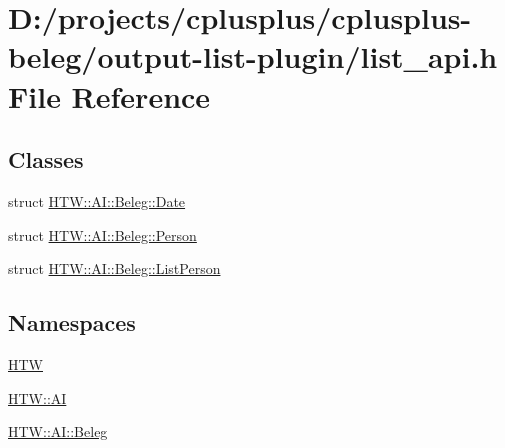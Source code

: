 \hypertarget{output-list-plugin_2list__api_8h}{\section{D\-:/projects/cplusplus/cplusplus-\/beleg/output-\/list-\/plugin/list\-\_\-api.h File Reference}
\label{output-list-plugin_2list__api_8h}
}
\subsection*{Classes}
\begin{DoxyCompactItemize}
\item 
struct \hyperlink{struct_h_t_w_1_1_a_i_1_1_beleg_1_1_date}{H\-T\-W\-::\-A\-I\-::\-Beleg\-::\-Date}
\item 
struct \hyperlink{struct_h_t_w_1_1_a_i_1_1_beleg_1_1_person}{H\-T\-W\-::\-A\-I\-::\-Beleg\-::\-Person}
\item 
struct \hyperlink{struct_h_t_w_1_1_a_i_1_1_beleg_1_1_list_person}{H\-T\-W\-::\-A\-I\-::\-Beleg\-::\-List\-Person}
\end{DoxyCompactItemize}
\subsection*{Namespaces}
\begin{DoxyCompactItemize}
\item 
\hyperlink{namespace_h_t_w}{H\-T\-W}
\item 
\hyperlink{namespace_h_t_w_1_1_a_i}{H\-T\-W\-::\-A\-I}
\item 
\hyperlink{namespace_h_t_w_1_1_a_i_1_1_beleg}{H\-T\-W\-::\-A\-I\-::\-Beleg}
\end{DoxyCompactItemize}
